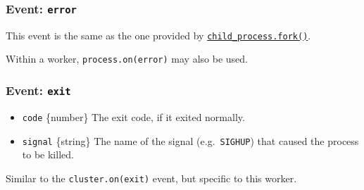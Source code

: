 \subsubsection{\texorpdfstring{Event:
\texttt{\textquotesingle{}error\textquotesingle{}}}{Event: \textquotesingle error\textquotesingle{}}}\label{event-error}

This event is the same as the one provided by
\href{child_process.md\#child_processforkmodulepath-args-options}{\texttt{child\_process.fork()}}.

Within a worker,
\texttt{process.on(\textquotesingle{}error\textquotesingle{})} may also
be used.

\subsubsection{\texorpdfstring{Event:
\texttt{\textquotesingle{}exit\textquotesingle{}}}{Event: \textquotesingle exit\textquotesingle{}}}\label{event-exit}

\begin{itemize}
\tightlist
\item
  \texttt{code} \{number\} The exit code, if it exited normally.
\item
  \texttt{signal} \{string\} The name of the signal
  (e.g.~\texttt{\textquotesingle{}SIGHUP\textquotesingle{}}) that caused
  the process to be killed.
\end{itemize}

Similar to the
\texttt{cluster.on(\textquotesingle{}exit\textquotesingle{})} event, but
specific to this worker.

